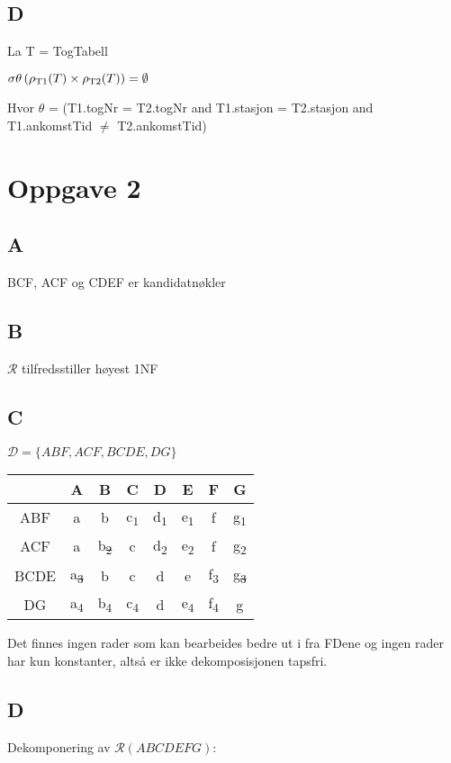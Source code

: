 \documentclass[12pt,norsk,a4paper]{article}
\begin{document}
\subsection*{D}
La T = TogTabell

$\sigma\theta\left(\rho\textsubscript{T1} (T) \times \rho\textsubscript{T2} (T)\right) = \emptyset$

Hvor $\theta$ = (T1.togNr = T2.togNr and T1.stasjon = T2.stasjon and T1.ankomstTid $\not=$ T2.ankomstTid)


\section*{Oppgave 2}
\subsection*{A}
BCF, ACF og CDEF er kandidatnøkler

\subsection*{B}
$\mathcal{R}$ tilfredsstiller høyest 1NF

\subsection*{C}
$\mathcal{D} = \{ABF, ACF, BCDE, DG\}$ \\

\begin{tabular}{c | c | c | c | c | c | c | c}
 & A & B & C & D & E & F & G\\
\hline
 ABF & a & b & c\textsubscript{1} & d\textsubscript{1} & e\textsubscript{1} & f & g\textsubscript{1} \\
\hline
 ACF & a & b\textsubscript{\sout{2}} & c & d\textsubscript{2} & e\textsubscript{2} & f & g\textsubscript{2} \\
\hline
 BCDE & a\textsubscript{\sout{3}} & b & c & d & e & f\textsubscript{3} & g\textsubscript{\sout{3}} \\
\hline
 DG & a\textsubscript{4} & b\textsubscript{4} & c\textsubscript{4} & d & e\textsubscript{4} & f\textsubscript{4} & g\\
\end{tabular}

Det finnes ingen rader som kan bearbeides bedre ut i fra FDene og ingen rader har kun konstanter, altså er ikke dekomposisjonen tapsfri.

\subsection*{D}
Dekomponering av $\mathcal{R}(ABCDEFG)$:
\end{document}
